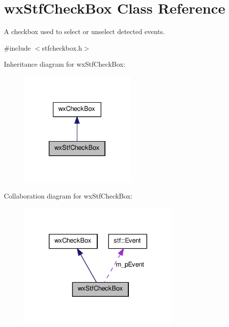 \hypertarget{classwxStfCheckBox}{
\section{wxStfCheckBox Class Reference}
\label{classwxStfCheckBox}
}


A checkbox used to select or unselect detected events.  




{\ttfamily \#include $<$stfcheckbox.h$>$}



Inheritance diagram for wxStfCheckBox:
\nopagebreak
\begin{figure}[H]
\begin{center}
\leavevmode
\includegraphics[width=166pt]{classwxStfCheckBox__inherit__graph}
\end{center}
\end{figure}


Collaboration diagram for wxStfCheckBox:
\nopagebreak
\begin{figure}[H]
\begin{center}
\leavevmode
\includegraphics[width=230pt]{classwxStfCheckBox__coll__graph}
\end{center}
\end{figure}
